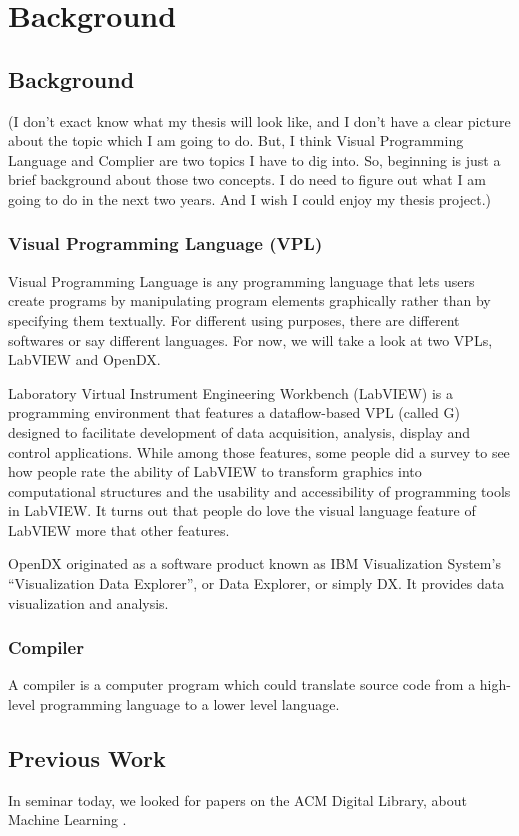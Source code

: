 \chapter{Background}
\label{chap:background}

\section{Background}
(I don’t exact know what my thesis will look like, and I don’t have a clear picture about the topic which I am going to do. But, I think Visual Programming Language and Complier are two topics I have to dig into. So, beginning is just a brief background about those two concepts. I do need to figure out what I am going to do in the next two years. And I wish I could enjoy my thesis project.)

\subsection{Visual Programming Language (VPL)}
Visual Programming Language is any programming language that lets users create programs by manipulating program elements graphically rather than by specifying them textually. For different using purposes, there are different softwares or say different languages. For now, we will take a look at two VPLs, LabVIEW and OpenDX.

Laboratory Virtual Instrument Engineering Workbench (LabVIEW) is a programming environment that features a dataflow-based VPL (called G) designed to facilitate development of data acquisition, analysis, display and control applications.\cite{WHITLEY:2001:VPW:2826730.2826856} While among those features, some people did a survey to see how people rate the ability of LabVIEW to transform graphics into computational structures and the usability and accessibility of programming tools in LabVIEW. It turns out that people do love the visual language feature of LabVIEW more that other features.

OpenDX originated as a software product known as IBM Visualization System’s “Visualization Data Explorer”, or Data Explorer, or simply DX. It provides data visualization and analysis. 

\subsection{Compiler}
A compiler is a computer program which could translate source code from a high-level programming language to a lower level language.

\section{Previous Work}

In seminar today, we looked for papers on the ACM Digital Library, about Machine Learning \cite{Tong:2002:SVM:944790.944793}.
